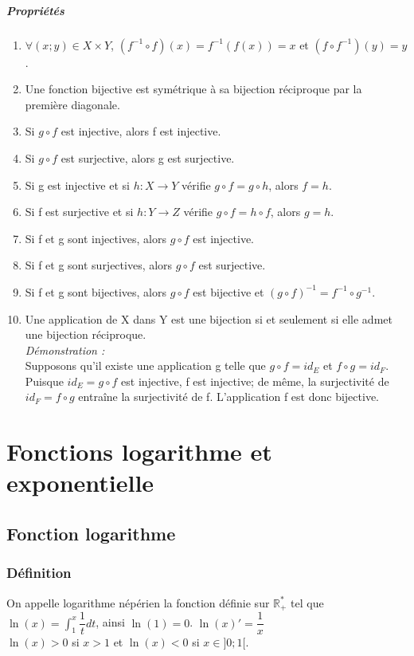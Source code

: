 \documentclass[a4paper,10pt]{book}
\newcommand{\R}{\mathbb{R}}
\begin{document}
\subparagraph*{Propriétés}
\begin{enumerate}
\item $\forall (x ; y) \in X\times Y$, $(f^{-1} \circ f)(x)=f^{-1}(f(x))=x$ et $(f\circ f^{-1})(y)=y$.
\item Une fonction bijective est symétrique à sa bijection réciproque par la première diagonale.
\item Si $g\circ f$ est injective, alors f est injective.
\item Si $g\circ f$ est surjective, alors g est surjective.
\item Si g est injective et si $h : X \longrightarrow Y$ vérifie $g\circ f = g\circ h$, alors $f = h$.
\item Si f est surjective et si $h : Y \longrightarrow Z$ vérifie $g\circ f = h\circ f$, alors $g = h$.
\item Si f et g sont injectives, alors $g\circ f$ est injective.
\item Si f et g sont surjectives, alors $g\circ f$ est surjective.
\item Si f et g sont bijectives, alors $g\circ f$ est bijective et $(g\circ f )^{-1}= f^{-1}\circ g^{-1}$.
\item Une application de X dans Y est une bijection si et seulement si elle admet une bijection réciproque.\\

\emph{Démonstration :}\\
Supposons qu’il existe une application g telle que $g\circ f = id_{E}$ et $f\circ g= id_{F}$.\\
Puisque $id_{E} = g\circ f$ est injective, f est injective; de même, la surjectivité de $id_{F} = f\circ g$ entraîne la surjectivité de f. L’application f est donc bijective.
\end{enumerate}

\section{Fonctions logarithme et exponentielle}
\subsection{Fonction logarithme}
\subsubsection*{Définition}
On appelle logarithme népérien la fonction définie sur $\R _{+} ^{*}$ tel que $\ln (x)=\int _{1} ^{x} \dfrac{1}{t} dt$, ainsi $\ln(1)=0$.
$\ln(x)'=\dfrac{1}{x}$\\
$\ln(x)>0$ si $x>1$ et $\ln(x) <0$ si $x \in ]0 ;1[$.
\end{document}
